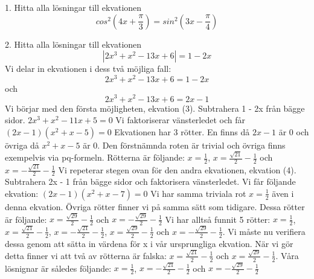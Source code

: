 \documentclass{article}
\begin{document}
  1. Hitta alla lösningar till ekvationen
  \begin{equation}
      cos^2(4x + \frac{\pi}{3}) = sin^2(3x-\frac{\pi}{4})
  \end{equation}
  
  2. Hitta alla lösningar till ekvationen
  \begin{equation}
      |2x^3 + x^2 - 13x + 6| = 1 - 2x
  \end{equation}
  Vi delar in ekvationen i dess två möjliga fall:
  \begin{equation}
      2x^3 + x^2 - 13x + 6 = 1 - 2x
  \end{equation}
  och 
  \begin{equation}
      2x^3 + x^2 - 13x + 6 = 2x - 1
  \end{equation}
  Vi börjar med den första möjligheten, ekvation (3). Subtrahera 1 - 2x från bägge sidor. \newline \newline
  $2x^3 + x^2 - 11x + 5 = 0$ \newline \newline
  Vi faktoriserar vänsterledet och får \newline \newline
  $(2x - 1)(x^2 + x - 5) = 0$ \newline \newline
  Ekvationen har 3 rötter. En finns då $2x - 1$ är 0 och övriga då $x^2 + x - 5$ är 0. Den förstnämnda roten är trivial och övriga finns exempelvis via pq-formeln. Rötterna är följande: $x = \frac{1}{2}$, $x = \frac{\sqrt{21}}{2} - \frac{1}{2}$ och $x = -\frac{\sqrt{21}}{2} - \frac{1}{2}$ \newline \newline
  Vi repeterar stegen ovan för den andra ekvationen, ekvation (4). Subtrahera 2x - 1 från bägge sidor och faktorisera vänsterledet. Vi får följande ekvation:\newline \newline
  $(2x - 1)(x^2 + x - 7) = 0$ \newline \newline
  Vi har samma triviala rot $x = \frac{1}{2}$ även i denna ekvation. Övriga rötter finner vi på samma sätt som tidigare. Dessa rötter är följande: $x = \frac{\sqrt{29}}{2} - \frac{1}{2}$ och $x = -\frac{\sqrt{29}}{2} - \frac{1}{2}$ \newline \newline
  Vi har alltså funnit 5 rötter: $x = \frac{1}{2}$, $x = \frac{\sqrt{21}}{2} - \frac{1}{2}$, $x = -\frac{\sqrt{21}}{2} - \frac{1}{2}$, $x = \frac{\sqrt{29}}{2} - \frac{1}{2}$ och $x = -\frac{\sqrt{29}}{2} - \frac{1}{2}$. Vi måste nu verifiera dessa genom att sätta in värdena för x i vår ursprungliga ekvation. När vi gör detta finner vi att två av rötterna är falska: $x = \frac{\sqrt{21}}{2} - \frac{1}{2}$ och $x = \frac{\sqrt{29}}{2} - \frac{1}{2}$. Våra lösnignar är således följande: $x = \frac{1}{2}$, $x = -\frac{\sqrt{21}}{2} - \frac{1}{2}$ och $x = -\frac{\sqrt{29}}{2} - \frac{1}{2}$ \newline \newline
\end{document}
